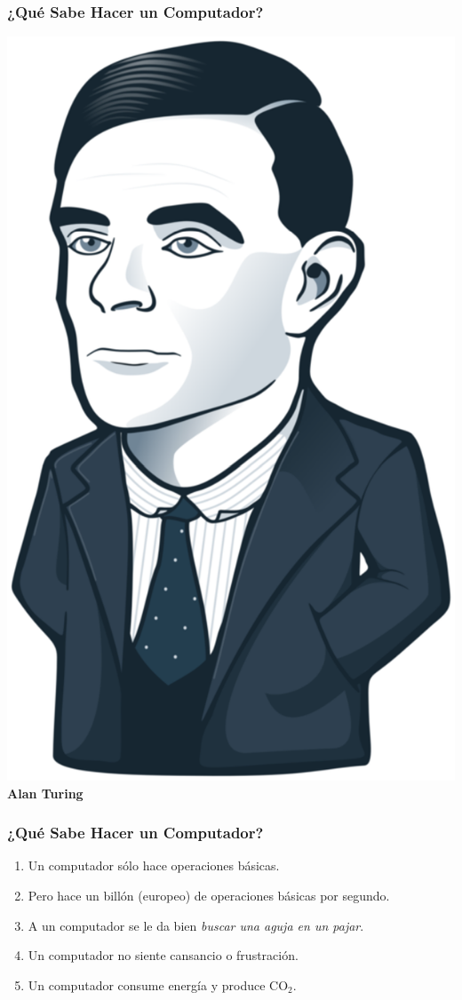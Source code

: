 \documentclass[a4paper,t,xcolor=pst,dvips,colortheme]{beamer}
\begin{document}
\begin{frame}[c]
    \frametitle{¿Qué Sabe Hacer un Computador?}
    \begin{center}
       \includegraphics[width=0.5\linewidth]{images/intro/alanTuring.eps} \\
        \textbf{Alan Turing}
    \end{center}



\end{frame}

\begin{frame}[c]
    \frametitle{¿Qué Sabe Hacer un Computador?}
    \begin{enumerate}[<+->]
        \item Un computador sólo hace operaciones básicas.
        \item Pero hace un billón (europeo) de operaciones básicas por segundo.
        \item A un computador se le da bien \emph{buscar una aguja en un pajar}.
        \item Un computador no siente cansancio o frustración.
        \item Un computador consume energía y produce CO$_{2}$.
    \end{enumerate}
\end{frame}
\end{document}
